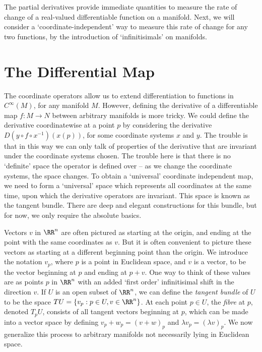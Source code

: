 The partial derivatives provide immediate quantities to measure the rate of change of a real-valued differentiable function on a manifold. Next, we will consider a `coordinate-independent' way to measure this rate of change for any two functions, by the introduction of `infinitisimals' on manifolds.

\section{The Differential Map}

The coordinate operators allow us to extend differentiation to functions in $C^\infty(M)$, for any manifold $M$. However, defining the derivative of a differentiable map $f: M \to N$ between arbitrary manifolds is more tricky. We could define the derivative coordinatewise at a point $p$ by considering the derivative $D(y \circ f \circ x^{-1})(x(p))$, for some coordinate systems $x$ and $y$. The trouble is that in this way we can only talk of properties of the derivative that are invariant under the coordinate systems chosen. The trouble here is that there is no `definite' space the operator is defined over -- as we change the coordinate systems, the space changes. To obtain a `universal' coordinate independent map, we need to form a `universal' space which represents all coordinates at the same time, upon which the derivative operators are invariant. This space is known as the tangent bundle. There are deep and elegant constructions for this bundle, but for now, we only require the absolute basics.

Vectors $v$ in $\RR^n$ are often pictured as starting at the origin, and ending at the point with the same coordinates as $v$. But it is often convenient to picture these vectors as starting at a different beginning point than the origin. We introduce the notation $v_p$, where $p$ is a point in Euclidean space, and $v$ is a vector, to be the vector beginning at $p$ and ending at $p + v$. One way to think of these values are as points $p$ in $\RR^n$ with an added `first order' infinitisimal shift in the direction $v$. If $U$ is an open subset of $\RR^n$, we can define the \emph{tangent bundle} of $U$ to be the space $TU = \{ v_p : p \in U, v \in \RR^n \}$. At each point $p \in U$, the \emph{fibre} at $p$, denoted $T_pU$, consists of all tangent vectors beginning at $p$, which can be made into a vector space by defining $v_p + w_p = (v + w)_p$ and $\lambda v_p = (\lambda v)_p$. We now generalize this process to arbitrary manifolds not necessarily lying in Euclidean space.

